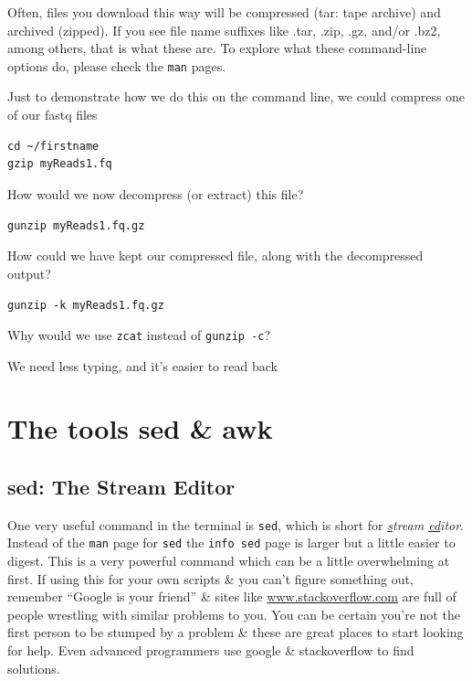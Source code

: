 \documentclass[a4paper,12pt,twoside]{memoir}
\begin{document}
Often, files you download this way will be compressed (tar: tape archive) and archived (zipped). 
If you see file name suffixes like .tar, .zip, .gz, and/or .bz2, among others, that is what these are.  
To explore what these command-line options do, please check the \texttt{man} pages. \\

\begin{steps}
Just to demonstrate how we do this on the command line, we could compress one of our fastq files
\begin{lstlisting}
cd ~/firstname
gzip myReads1.fq
\end{lstlisting}
\end{steps}

\begin{questions}
How would we now decompress (or extract) this file?\\
\begin{answer}
\texttt{gunzip  myReads1.fq.gz}\\
\end{answer}

How could we have kept our compressed file, along with the decompressed output?\\
\begin{answer}
\texttt{gunzip -k myReads1.fq.gz}\\
\end{answer}

Why would we use \texttt{zcat} instead of \texttt{gunzip -c}?\\
\begin{answer}
We need less typing, and it's easier to read back
\end{answer}
\end{questions}


\chapter{The tools sed \& awk}

\section{sed: The Stream Editor}
\begin{information}
One very useful command in the terminal is \texttt{sed}, which is short for \textit{\underline{s}tream \underline{ed}itor}.
Instead of the \texttt{man} page for \texttt{sed} the \texttt{info sed} page is larger but a little easier to digest.
This is a very powerful command which can be a little overwhelming at first.
If using this for your own scripts \& you can't figure something out, remember ``Google is your friend'' \& sites like \url{www.stackoverflow.com} are full of people wrestling with similar problems to you.
You can be certain you're not the first person to be stumped by a problem \& these are great places to start looking for help. 
Even advanced programmers use google \& stackoverflow to find solutions.\\
\end{information}
\end{document}
